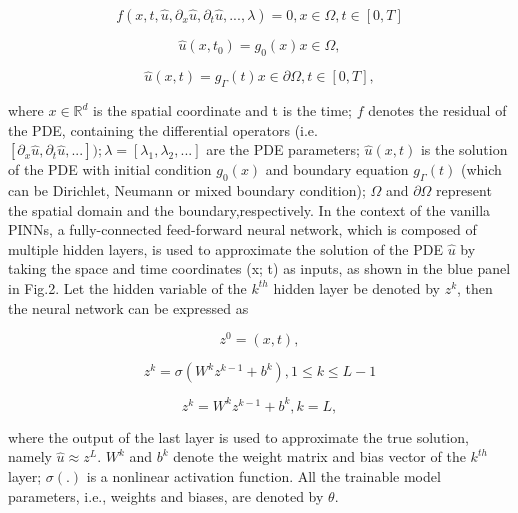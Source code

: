 \documentclass[conference,compsoc]{IEEEtran}
\begin{document}
\begin{equation}
   f(x,t,\hat{u},\partial_x\hat{u},\partial_t\hat{u},...,\lambda) = 0, x\in\Omega, t \in [0,T] 
\end{equation}

\begin{equation}
    \hat{u}(x,t_0) = g_0(x) x\in\Omega ,
\end{equation}

\begin{equation}
    \hat{u}(x,t) = g_\Gamma(t) x\in \partial\Omega , t \in [0,T],
\end{equation}

where $x \in \mathbb{R}^d$ is the spatial coordinate and t is the time; $f$ denotes the residual of the PDE, containing the differential operators (i.e. $[\partial_x\hat{u},\partial_t\hat{u},...]); \mathbb{\lambda} = [\lambda_1,\lambda_2,...]$ are the PDE parameters; $\hat{u}(x,t)$ is the solution of the PDE with initial condition $g_0(x)$ and boundary equation $g_\Gamma(t)$ (which can be Dirichlet, Neumann or mixed boundary condition)\cite{raissi2019physics};
$\Omega$ and $\partial\Omega$ represent the spatial domain and the boundary,respectively.
In the context of the vanilla PINNs, a
fully-connected feed-forward neural network, which is
composed of multiple hidden layers, is used to approximate
the solution of the PDE $\hat{u}$ by taking the space and time
coordinates (x; t) as inputs, as shown in the blue panel in Fig.2\cite{raissi2019physics}. Let the hidden variable of the $k^{th}$ hidden layer be
denoted by $z^k$, then the neural network can be expressed as

\begin{equation}
    z^0 = (x,t),
\end{equation}

\begin{equation}
    z^k = \sigma(W^kz^{k-1} + b^k), 1 \leq k \leq L-1
\end{equation}

\begin{equation}
    z^k = W^kz^{k-1} + b^k, k=L,
\end{equation}

where the output of the last layer is used to approximate the
true solution, namely $\hat{u} \approx z^L$. $W^k$ and $b^k$ denote the weight matrix and bias vector of the $k^{th}$ layer; $\sigma(.)$ is a nonlinear
activation function. All the trainable model parameters, i.e.,
weights and biases, are denoted by $\theta$\cite{raissi2019physics}.
\end{document}
